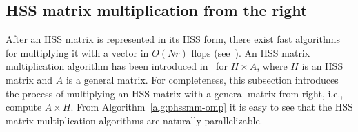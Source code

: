 \documentclass[times]{nlaauth}
\newcounter{algorithm}
\begin{document}
\subsection{HSS matrix multiplication from the right}

After an HSS matrix is represented in its HSS form, there exist fast
algorithms for multiplying it with a vector in $O(Nr)$ flops
(see~\cite{ChandrasekaranDe06,Lyons-thesis}).
An HSS matrix multiplication algorithm has been introduced in~\cite{Lyons-thesis} for $H\times A$, where $H$ is an HSS matrix and $A$ is a general matrix.
For completeness, this subsection introduces the process of multiplying an HSS matrix with a general matrix
from right, i.e., compute $A\times H$. From Algorithm~\ref{alg:phssmm-omp} it is easy to see that the HSS matrix multiplication algorithms
are naturally parallelizable.
\end{document}
